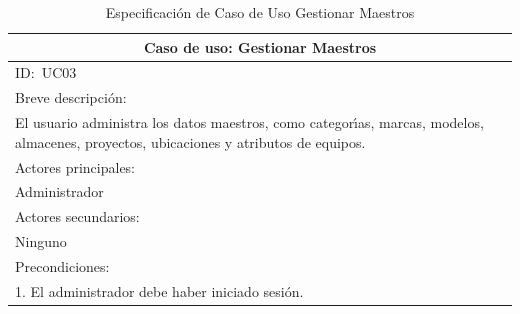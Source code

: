 \documentclass[stu, 12pt, letterpaper, donotrepeattitle, floatsintext, natbib]{apa7}
\begin{document}
\newpage
\begin{longtable}{@{} p{16.5cm} @{}}
    \caption{Especificaci\'on de Caso de Uso Gestionar Maestros}\label{tab:UC03}                                                                                                                  \\ \toprule
    \multicolumn{1}{c}{Caso de uso: Gestionar Maestros}                                                                                                                                           \\ \midrule
    ID:~UC03                                                                                                                                                                                      \\ \midrule
    Breve descripci\'on:                                                                                                                                                                          \\
    El usuario administra los datos maestros, como categor\'{\i}as, marcas, modelos, almacenes, proyectos, ubicaciones y atributos de equipos.                                                    \\ \midrule
    Actores principales:                                                                                                                                                                          \\
    Administrador                                                                                                                                                                                 \\ \midrule
    Actores secundarios:                                                                                                                                                                          \\
    Ninguno                                                                                                                                                                                       \\ \midrule
    Precondiciones:                                                                                                                                                                               \\
    1. El administrador debe haber iniciado sesi\'on.                                                                                                                                             \\ \midrule

\end{longtable}
\end{document}
